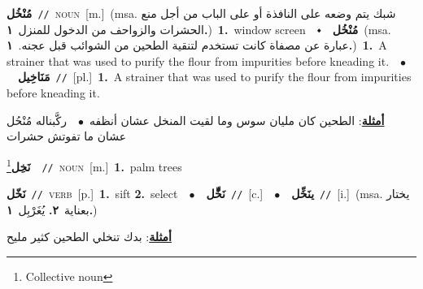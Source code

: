 \documentclass[10pt,a4paper,twoside]{article} %
\begin{document}
\begin{multicols}{2}
{\setlength\topsep{0pt}\textbf{\foreignlanguage{arabic}{مُنْخُل}}\ {\color{gray}\texttt{//}\color{black}}\ \textsc{noun}\ [m.]\ \color{gray}(msa. \foreignlanguage{arabic}{شبك يتم وضعه على النافذة أو على الباب من أجل منع الحشرات والزواحف من الدخول للمنزل}~\foreignlanguage{arabic}{\textbf{١.}})\color{black}\ \textbf{1.}~window screen\ \ $\smblkdiamond$\ \ \setlength\topsep{0pt}\textbf{\foreignlanguage{arabic}{مُنْخُل}}\ \color{gray}(msa. \foreignlanguage{arabic}{عبارة عن مصفاة كانت تستخدم لتنقية الطحين من الشوائب قبل عجنه.}~\foreignlanguage{arabic}{\textbf{١.}})\color{black}\ \textbf{1.}~A strainer that was used to purify the flour from impurities before kneading it.\ \ $\bullet$\ \ \setlength\topsep{0pt}\textbf{\foreignlanguage{arabic}{مَنَاخِيل}}\ {\color{gray}\texttt{//}\color{black}}\ [pl.]\ \textbf{1.}~A strainer that was used to purify the flour from impurities before kneading it.\  \begin{flushright}\color{gray}\foreignlanguage{arabic}{\textbf{\underline{\foreignlanguage{arabic}{أمثلة}}}: الطحين كان مليان سوس وما لقيت المنخل عشان أنظفه\ $\bullet$\ \  ركَّبناله مُنْحُل عشان ما تفوتش حشرات}\end{flushright}\color{black}} \vspace{2mm}

{\setlength\topsep{0pt}\textbf{\foreignlanguage{arabic}{نَخِل}}\footnote{Collective noun}\ \ {\color{gray}\texttt{//}\color{black}}\ \textsc{noun}\ [m.]\ \textbf{1.}~palm trees\ } \vspace{2mm}

{\setlength\topsep{0pt}\textbf{\foreignlanguage{arabic}{نَخّل}}\ {\color{gray}\texttt{//}\color{black}}\ \textsc{verb}\ [p.]\ \textbf{1.}~sift  \textbf{2.}~select\ \ $\bullet$\ \ \setlength\topsep{0pt}\textbf{\foreignlanguage{arabic}{نَخِّّل}}\ {\color{gray}\texttt{//}\color{black}}\ [c.]\ \ $\bullet$\ \ \setlength\topsep{0pt}\textbf{\foreignlanguage{arabic}{ينَخِّل}}\ {\color{gray}\texttt{//}\color{black}}\ [i.]\ \color{gray}(msa. \foreignlanguage{arabic}{يختار بعناية}~\foreignlanguage{arabic}{\textbf{٢.}}  \foreignlanguage{arabic}{يُغَرْبِل}~\foreignlanguage{arabic}{\textbf{١.}})\color{black}\  \begin{flushright}\color{gray}\foreignlanguage{arabic}{\textbf{\underline{\foreignlanguage{arabic}{أمثلة}}}: بدك تنخلي الطحين كثير مليح}\end{flushright}\color{black}} \vspace{2mm}


\end{multicols}
\end{document}
